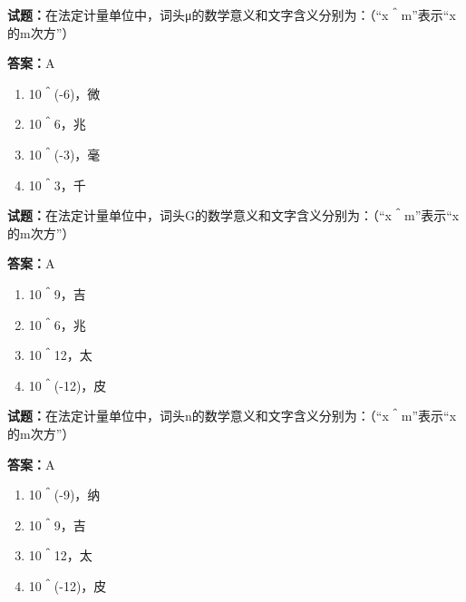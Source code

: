 \documentclass{ctexbook}
\begin{document}




\vspace{1em}

\textbf{试题：}在法定计量单位中，词头μ的数学意义和文字含义分别为：（“x＾m”表示“x的m次方”） 

\textbf{答案：}A 

\begin{enumerate}[leftmargin=3em]
  \item 10＾(-6)，微 

  \item 10＾6，兆 

  \item 10＾(-3)，毫 

  \item 10＾3，千 

\end{enumerate}





\vspace{1em}

\textbf{试题：}在法定计量单位中，词头G的数学意义和文字含义分别为：（“x＾m”表示“x的m次方”） 

\textbf{答案：}A 

\begin{enumerate}[leftmargin=3em]
  \item 10＾9，吉 

  \item 10＾6，兆 

  \item 10＾12，太 

  \item 10＾(-12)，皮 

\end{enumerate}





\vspace{1em}

\textbf{试题：}在法定计量单位中，词头n的数学意义和文字含义分别为：（“x＾m”表示“x的m次方”） 

\textbf{答案：}A 

\begin{enumerate}[leftmargin=3em]
  \item 10＾(-9)，纳 

  \item 10＾9，吉 

  \item 10＾12，太 

  \item 10＾(-12)，皮 

\end{enumerate}
\end{document}
